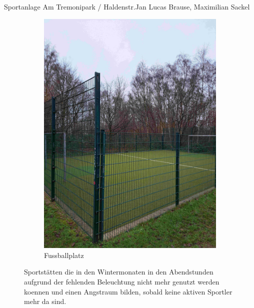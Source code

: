 \documentclass{../../templates/amendment}
\begin{document}
\begin{boxed}{Sportanlage Am Tremonipark / Haldenstr.}{Jan Lucas Brause, Maximilian Sackel}
\begin{figure}[htpb]
\begin{subfigure}[]{0.32\textwidth}
\begin{center}
                \includegraphics[width=\linewidth]{pictures/photo4.jpg}
                \caption{Fussballplatz}%
            \end{center}
        \end{subfigure}
        \caption{Sportstätten die in den Wintermonaten in den Abendstunden aufgrund der fehlenden
            Beleuchtung nicht mehr genutzt werden koennen und einen Angstraum
        bilden, sobald keine aktiven Sportler mehr da sind.}
    \end{figure}


\end{boxed}
\end{document}

